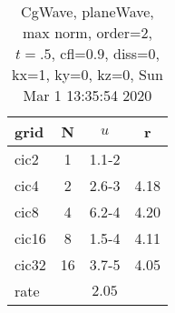 \begin{table}[H]\tableFont %
\begin{center}
\begin{tabular}{|l|c|c|c|} \hline 
grid  & N &  $ u $ & r \\ \hline 
      cic2 &     1 & \num{1.1}{-2} &       \\ \hline
      cic4 &     2 & \num{2.6}{-3} &  4.18  \\ \hline
      cic8 &     4 & \num{6.2}{-4} &  4.20  \\ \hline
     cic16 &     8 & \num{1.5}{-4} &  4.11  \\ \hline
     cic32 &    16 & \num{3.7}{-5} &  4.05  \\ \hline
    rate             &       &  $2.05$       &       \\ \hline
\end{tabular}
\caption{CgWave, planeWave, max norm, order=$2$, $t=.5$, cfl=$0.9$, diss=$0$, kx=1, ky=0, kz=0, Sun Mar  1 13:35:54 2020}\label{table:planeWaveOrder2max}
\end{center}
\end{table}
